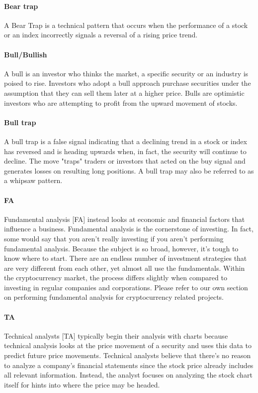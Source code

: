 \paragraph{Bear trap}
A Bear Trap is a technical pattern that occurs when the performance of a stock or an index incorrectly signals a reversal of a rising price trend.  

\paragraph{Bull/Bullish}
A bull is an investor who thinks the market, a specific security or an industry is poised to rise. Investors who adopt a bull approach purchase securities under the assumption that they can sell them later at a higher price. Bulls are optimistic investors who are attempting to profit from the upward movement of stocks.  

\paragraph{Bull trap}
A bull trap is a false signal indicating that a declining trend in a stock or index has reversed and is heading upwards when, in fact, the security will continue to decline. The move "traps" traders or investors that acted on the buy signal and generates losses on resulting long positions. A bull trap may also be referred to as a whipsaw pattern.  

\paragraph{FA}
Fundamental analysis [FA] instead looks at economic and financial factors that influence a business. Fundamental analysis is the cornerstone of investing. In fact, some would say that you aren't really investing if you aren't performing fundamental analysis. Because the subject is so broad, however, it's tough to know where to start. There are an endless number of investment strategies that are very different from each other, yet almost all use the fundamentals. Within the cryptocurrency market, the process differs slightly when compared to investing in regular companies and corporations. Please refer to our own section on performing fundamental analysis for cryptocurrency related projects.

\paragraph{TA}
Technical analysts [TA] typically begin their analysis with charts because technical analysis looks at the price movement of a security and uses this data to predict future price movements. Technical analysts believe that there’s no reason to analyze a company’s financial statements since the stock price already includes all relevant information. Instead, the analyst focuses on analyzing the stock chart itself for hints into where the price may be headed.  

